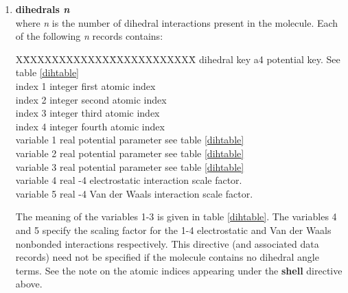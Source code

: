 \begin{enumerate}
\begin{table}[ht]
\end{table}

\begin{tabbing}
X\=XXXXXXXXXXXX\=XXXXXXXXXXXX\=\kill
\> angle key \> a4 \> potential key. See table \ref{angtable}\\
\> index 1 \> integer \> first atomic index\\
\> index 2 \> integer \> second atomic index (central site)\\
\> index 3 \> integer \> third atomic index\\
\> variable 1 \> real \> potential parameter see table
\ref{angtable}\\
\> variable 2 \> real \> potential parameter see table
\ref{angtable}\\
\> variable 2 \> real \> potential parameter see table
\ref{angtable}\\
\> variable 3 \> real \> potential parameter see table
\ref{angtable}\\
\> variable 4 \> real \> potential parameter see table
\ref{angtable}\\
\end{tabbing}
The meaning of these variables is given in table \ref{angtable}.
See the note on the atomic indices appearing under the {\bf shell}
directive above.
This directive (and associated data records) need not be specified if
the molecule contains no angular terms.
\clearpage
\item{\bf dihedrals {\em n}}\\
where {\em n} is the number of dihedral interactions present in the
molecule. Each of the following {\em n} records contains:
\begin{tabbing}
X\=XXXXXXXXXXXX\=XXXXXXXXXXXX\=\kill
\> dihedral key \> a4 \> potential key. See table \ref{dihtable}\\
\> index 1 \> integer \> first atomic index\\
\> index 2 \> integer \> second atomic index\\
\> index 3 \> integer \> third atomic index\\
\> index 4 \> integer \> fourth atomic index\\
\> variable 1 \> real \> potential parameter see table
\ref{dihtable}\\
\> variable 2 \> real \> potential parameter see table
\ref{dihtable}\\
\> variable 3 \> real \> potential parameter see table
\ref{dihtable}\\
\> variable 4 \> real -4 electrostatic interaction scale factor.\\
\> variable 5 \> real -4 Van der Waals interaction scale factor.\\
\end{tabbing}
The meaning of the variables 1-3 is given in table \ref{dihtable}.
The variables 4 and 5 specify the scaling factor for the 1-4
electrostatic and Van der Waals nonbonded interactions respectively.
This directive (and associated data records) need not be specified if
the molecule contains no dihedral angle terms.  See the note on the
atomic indices appearing under the {\bf shell} directive above.


\end{enumerate}
